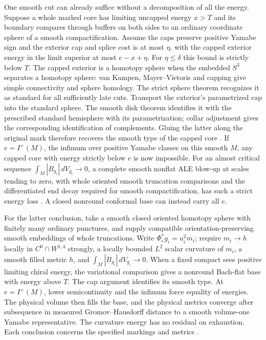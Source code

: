 \documentclass[11pt]{article}
\numberwithin{equation}{section}
\begin{document}
One smooth cut can already suffice without a decomposition of all the
energy. Suppose a whole marked core has limiting uncapped energy \(x>T\) and its
boundary compares through buffers on both sides to an ordinary
coordinate sphere of a smooth compactification. Assume the caps
preserve positive Yamabe sign and the exterior cap and splice cost
is at most \(\eta\), with the capped exterior energy in the limit superior at most \(e-x+\eta\).
For \(\eta\le\delta\) this bound is strictly below \(T\).
The capped exterior is a homotopy sphere when the embedded \(S^3\)
separates a homotopy sphere: van Kampen, Mayer--Vietoris and capping
give simple connectivity and sphere homology. The strict sphere theorem
recognizes it as standard for all sufficiently late cuts. Transport
the exterior's parametrized cap into the standard sphere. The smooth
disk theorem identifies it with the prescribed standard hemisphere
with its parametrization; collar adjustment gives the corresponding
identification of complements. Gluing the latter along the original
mark therefore recovers the smooth type of the capped core
\cite[Theorem~C]{Palais1960Extending}\cite{Baker2026MarkedNecks}. If \(e=I^+(M)\), the infimum over positive
Yamabe classes on this smooth \(M\), any capped core with energy
strictly below \(e\) is now impossible. For an almost critical sequence
\(\int_M|B_{g_i}|\,dV_{g_i}\to0\), a complete smooth nonflat ALE
blow-up at scales tending to zero, with whole oriented smooth
truncation comparisons and the differentiated end decay required for
smooth compactification, has such a strict energy loss
\cite{Baker2026MarkedNecks}. A closed nonround conformal base can instead
carry all \(e\).

For the latter conclusion, take a smooth closed oriented homotopy
sphere with finitely many ordinary punctures, and supply compatible
orientation-preserving smooth embeddings of whole truncations. Write \(\Phi_i^*g_i=u_i^2m_i\);
require \(m_i\to h\) locally in \(C^0\cap W^{1,4}\) strongly, a
locally bounded \(L^2\) scalar curvature of \(m_i\), a smooth filled
metric \(h\), and \(\int_M|B_{g_i}|\,dV_{g_i}\to0\).
When a fixed compact sees positive limiting chiral energy, the
variational comparison gives a nonround Bach-flat base with energy
above \(T\). The cap argument identifies its smooth type. At
\(e=I^+(M)\), lower semicontinuity and the infimum force equality of
energies. The physical volume then fills the base, and the physical
metrics converge after subsequence in measured Gromov--Hausdorff distance to a smooth
volume-one Yamabe representative. The curvature energy has no residual
on exhaustion. Each conclusion concerns the specified markings and
metrics \cite{Baker2026MarkedLimits}.
\end{document}
